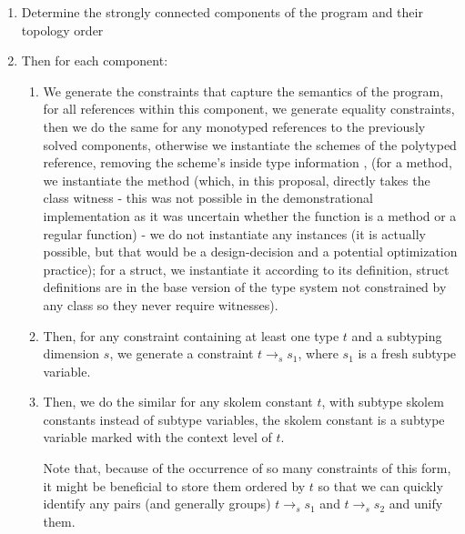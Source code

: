 \begin{enumerate}
    \item Determine the strongly connected components of the program and their topology order

    \item Then for each component:

    \begin{enumerate}
        \item We generate the constraints that capture the semantics of the program, for all references within this component, we generate equality constraints, then we do the same for any monotyped references to the previously solved components, otherwise we instantiate the schemes of the polytyped reference, removing the scheme's inside type information , (for a method, we instantiate the method (which, in this proposal, directly takes the class witness - this was not possible in the demonstrational implementation as it was uncertain whether the function is a method or a regular function) - we do not instantiate any instances (it is actually possible, but that would be a design-decision and a potential optimization practice); for a struct, we instantiate it according to its definition, struct definitions are in the base version of the type system not constrained by any class so they never require witnesses).

        \item Then, for any constraint containing at least one type $t$ and a subtyping dimension $s$, we generate a constraint $t \to_s s_1$, where $s_1$ is a fresh subtype variable.

        \item Then, we do the similar for any skolem constant $t$, with subtype skolem constants instead of subtype variables, the skolem constant is a subtype variable marked with the context level of $t$. \label{gen_subskolem}

        Note that, because of the occurrence of so many constraints of this form, it might be beneficial to store them ordered by $t$ so that we can quickly identify any pairs (and generally groups) $t \to_s s_1$ and $t \to_s s_2$ and unify them. \label{mapping_once}



\end{enumerate}
\end{enumerate}
